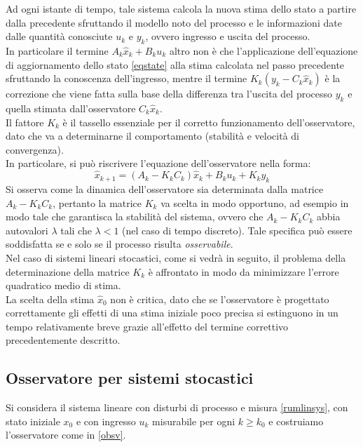 Ad ogni istante di tempo, tale sistema calcola la nuova stima dello stato a partire dalla precedente sfruttando il modello noto del processo e le informazioni date dalle quantità conosciute $u_k$ e $y_k$, ovvero ingresso e uscita del processo. \\
In particolare il termine $A_k\hat{x}_k+B_ku_k$ altro non è che l'applicazione dell'equazione di aggiornamento dello stato \eqref{eqstate} alla stima calcolata nel passo precedente sfruttando la conoscenza dell'ingresso, mentre il termine $K_k(y_k-C_k\hat{x}_k)$ è la correzione che viene fatta sulla base della differenza tra l'uscita del processo $y_k$ e quella stimata dall'osservatore $C_k\hat{x}_k$.\\
Il fattore $K_k$ è il tassello essenziale per il corretto funzionamento dell'osservatore, dato che va a determinarne il comportamento (stabilità e velocità di convergenza).\\
In particolare, si può riscrivere l'equazione dell'osservatore nella forma:
\begin{equation}
\label{obsv2}
\hat{x}_{k+1}=(A_k-K_kC_k)\hat{x}_k+B_ku_k+K_ky_k
\end{equation}
Si osserva come la dinamica dell'osservatore sia determinata dalla matrice $A_k-K_kC_k$, pertanto la matrice $K_k$ va scelta in modo opportuno, ad esempio in modo tale che garantisca la stabilità del sistema, ovvero che $A_k-K_kC_k$ abbia autovalori $\lambda$ tali che $\lambda<1$ (nel caso di tempo discreto). Tale specifica può essere soddisfatta se e solo se il processo risulta \textit{osservabile}.\\
Nel caso di sistemi lineari stocastici, come si vedrà in seguito, il problema della determinazione della matrice $K_k$ è affrontato in modo da minimizzare l'errore quadratico medio di stima.\\
La scelta della stima $\hat{x}_0$ non è critica, dato che se l'osservatore è progettato correttamente gli effetti di una stima iniziale poco precisa si estinguono in un tempo relativamente breve grazie all'effetto del termine correttivo precedentemente descritto.

\subsection{Osservatore per sistemi stocastici}
Si considera il sistema lineare con disturbi di processo e misura \eqref{rumlinsys}, con stato iniziale $x_0$ e con ingresso $u_k$ misurabile per ogni $k \geq k_0$ e costruiamo l'osservatore come in \eqref{obsv}.

